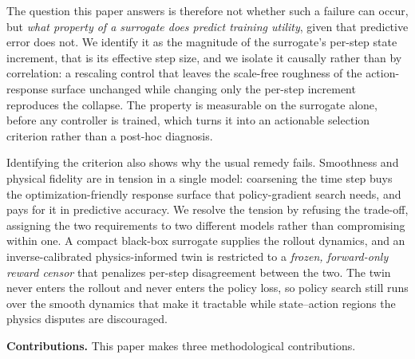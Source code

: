 \documentclass{ieeeaccess}
\begin{document}
The question this paper answers is therefore not whether such a failure can
occur, but \emph{what property of a surrogate does predict training utility},
given that predictive error does not. We identify it as the magnitude of the
surrogate's per-step state increment, that is its effective step size, and we
isolate it causally rather than by correlation: a rescaling control that leaves
the scale-free roughness of the action-response surface unchanged while changing
only the per-step increment reproduces the collapse. The property is measurable
on the surrogate alone, before any controller is trained, which turns it into an
actionable selection criterion rather than a post-hoc diagnosis.

Identifying the criterion also shows why the usual remedy fails. Smoothness and
physical fidelity are in tension in a single model: coarsening the time step
buys the optimization-friendly response surface that policy-gradient search
needs, and pays for it in predictive accuracy. We resolve the tension by
refusing the trade-off, assigning the two requirements to two different models
rather than compromising within one. A compact black-box surrogate supplies the
rollout dynamics, and an inverse-calibrated physics-informed twin is restricted
to a \emph{frozen, forward-only reward censor} that penalizes per-step
disagreement between the two. The twin never enters the rollout and never enters
the policy loss, so policy search still runs over the smooth dynamics that make
it tractable while state--action regions the physics disputes are discouraged.

\textbf{Contributions.} This paper makes three methodological contributions.
\end{document}
